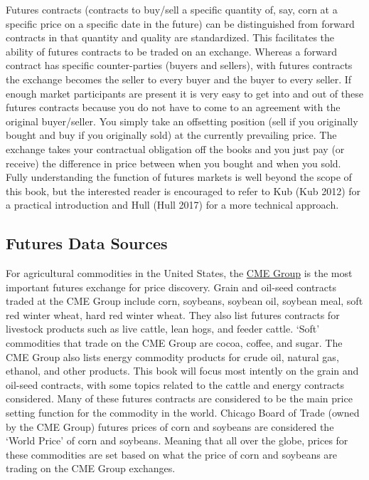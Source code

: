 \documentclass[
  letterpaper,
  DIV=11,
  numbers=noendperiod]{scrreprt}
\begin{document}
Futures contracts (contracts to buy/sell a specific quantity of, say,
corn at a specific price on a specific date in the future) can be
distinguished from forward contracts in that quantity and quality are
standardized. This facilitates the ability of futures contracts to be
traded on an exchange. Whereas a forward contract has specific
counter-parties (buyers and sellers), with futures contracts the
exchange becomes the seller to every buyer and the buyer to every
seller. If enough market participants are present it is very easy to get
into and out of these futures contracts because you do not have to come
to an agreement with the original buyer/seller. You simply take an
offsetting position (sell if you originally bought and buy if you
originally sold) at the currently prevailing price. The exchange takes
your contractual obligation off the books and you just pay (or receive)
the difference in price between when you bought and when you sold. Fully
understanding the function of futures markets is well beyond the scope
of this book, but the interested reader is encouraged to refer to Kub
(Kub 2012) for a practical introduction and Hull (Hull 2017) for a more
technical approach.

\subsection{Futures Data Sources}\label{futures-data-sources}

For agricultural commodities in the United States, the
\href{http://www.cmegroup.com/}{CME Group} is the most important futures
exchange for price discovery. Grain and oil-seed contracts traded at the
CME Group include corn, soybeans, soybean oil, soybean meal, soft red
winter wheat, hard red winter wheat. They also list futures contracts
for livestock products such as live cattle, lean hogs, and feeder
cattle. `Soft' commodities that trade on the CME Group are cocoa,
coffee, and sugar. The CME Group also lists energy commodity products
for crude oil, natural gas, ethanol, and other products. This book will
focus most intently on the grain and oil-seed contracts, with some
topics related to the cattle and energy contracts considered. Many of
these futures contracts are considered to be the main price setting
function for the commodity in the world. Chicago Board of Trade (owned
by the CME Group) futures prices of corn and soybeans are considered the
`World Price' of corn and soybeans. Meaning that all over the globe,
prices for these commodities are set based on what the price of corn and
soybeans are trading on the CME Group exchanges.
\end{document}
